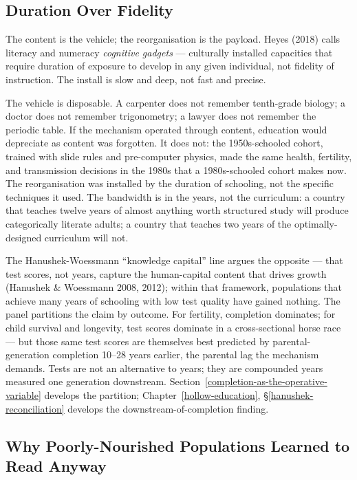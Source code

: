 \documentclass[12pt,letterpaper]{article}
\begin{document}
\subsection{Duration Over Fidelity}\label{duration-over-fidelity}

The content is the vehicle; the reorganisation is the payload. Heyes
(2018) calls literacy and numeracy \emph{cognitive gadgets} ---
culturally installed capacities that require duration of exposure to
develop in any given individual, not fidelity of instruction. The
install is slow and deep, not fast and precise.

The vehicle is disposable. A carpenter does not remember
tenth-grade biology; a doctor does not remember trigonometry; a
lawyer does not remember the periodic table. If the mechanism
operated through content, education would depreciate as content was
forgotten. It does not: the 1950s-schooled cohort, trained with slide
rules and pre-computer physics, made the same health, fertility, and
transmission decisions in the 1980s that a 1980s-schooled cohort
makes now. The reorganisation was installed by the duration of
schooling, not the specific techniques it used. The bandwidth is in
the years, not the curriculum: a country that teaches twelve years
of almost anything worth structured study will produce categorically
literate adults; a country that teaches two years of the
optimally-designed curriculum will not.

The Hanushek-Woessmann ``knowledge capital'' line argues the
opposite --- that test scores, not years, capture the human-capital
content that drives growth (Hanushek \& Woessmann 2008, 2012); within
that framework, populations that achieve many years of schooling with
low test quality have gained nothing. The panel partitions the claim
by outcome. For fertility, completion dominates; for child survival
and longevity, test scores dominate in a cross-sectional horse race
--- but those same test scores are themselves best predicted by
parental-generation completion 10--28 years earlier, the parental lag
the mechanism demands. Tests are not an alternative to years; they
are compounded years measured one generation downstream.
Section~\ref{completion-as-the-operative-variable} develops the
partition; Chapter~\ref{hollow-education},
\S\ref{hanushek-reconciliation} develops the
downstream-of-completion finding.

\subsection{Why Poorly-Nourished Populations Learned to Read Anyway}\label{why-poorly-nourished-populations-learned-to-read}
\end{document}

